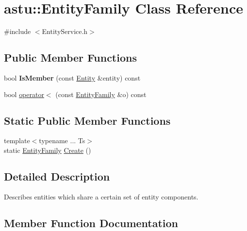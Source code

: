 \hypertarget{classastu_1_1EntityFamily}{}\section{astu\+:\+:Entity\+Family Class Reference}
\label{classastu_1_1EntityFamily}


{\ttfamily \#include $<$Entity\+Service.\+h$>$}

\subsection*{Public Member Functions}
\begin{DoxyCompactItemize}
\item 
\mbox{\label{classastu_1_1EntityFamily_a8452fd5df3f194dd8824b9ea88d426bf}} 
bool {\bfseries Is\+Member} (const \hyperlink{classastu_1_1Entity}{Entity} \&entity) const
\item 
bool \hyperlink{classastu_1_1EntityFamily_ac2389d2f9807b3ebdb570f0fd8930957}{operator$<$} (const \hyperlink{classastu_1_1EntityFamily}{Entity\+Family} \&o) const
\end{DoxyCompactItemize}
\subsection*{Static Public Member Functions}
\begin{DoxyCompactItemize}
\item 
{\footnotesize template$<$typename ... Ts$>$ }\\static \hyperlink{classastu_1_1EntityFamily}{Entity\+Family} \hyperlink{classastu_1_1EntityFamily_ad201d4186eaef0f02c07a07889fc7763}{Create} ()
\end{DoxyCompactItemize}


\subsection{Detailed Description}
Describes entities which share a certain set of entity components. 

\subsection{Member Function Documentation}
\mbox{\label{classastu_1_1EntityFamily_ad201d4186eaef0f02c07a07889fc7763}} 
